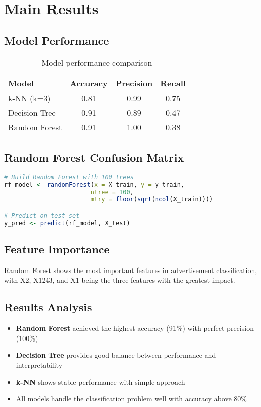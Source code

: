\documentclass[twoside,final]{hcmut-report}
\begin{document}
\section{Main Results}
\label{sec:main-results}

\subsection{Model Performance}

\begin{table}[H]
\centering
\caption{Model performance comparison}
\label{tab:model-comparison}
\begin{tabular}{lccc}
\toprule
\textbf{Model} & \textbf{Accuracy} & \textbf{Precision} & \textbf{Recall} \\
\midrule
k-NN (k=3) & 0.81 & 0.99 & 0.75 \\
Decision Tree & 0.91 & 0.89 & 0.47 \\
Random Forest & 0.91 & 1.00 & 0.38 \\
\bottomrule
\end{tabular}
\end{table}

\subsection{Random Forest Confusion Matrix}

\begin{lstlisting}[language=R, caption={R code for Random Forest}, label={lst:random-forest}]
# Build Random Forest with 100 trees
rf_model <- randomForest(x = X_train, y = y_train, 
                        ntree = 100, 
                        mtry = floor(sqrt(ncol(X_train))))

# Predict on test set
y_pred <- predict(rf_model, X_test)
\end{lstlisting}

\subsection{Feature Importance}
Random Forest shows the most important features in advertisement classification, with X2, X1243, and X1 being the three features with the greatest impact.

\subsection{Results Analysis}
\begin{itemize}
  \item \textbf{Random Forest} achieved the highest accuracy (91\%) with perfect precision (100\%)
  \item \textbf{Decision Tree} provides good balance between performance and interpretability
  \item \textbf{k-NN} shows stable performance with simple approach
  \item All models handle the classification problem well with accuracy above 80\%
\end{itemize}
\end{document}
